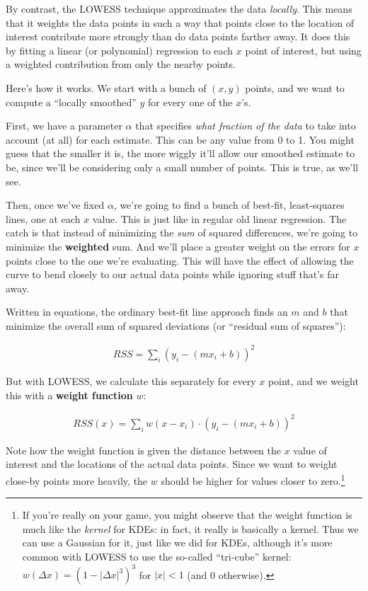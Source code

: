 By contrast, the LOWESS technique approximates the data \textit{locally}. This
means that it weights the data points in such a way that points close to the
location of interest contribute more strongly than do data points farther
away. It does this by fitting a linear (or polynomial) regression to each $x$
point of interest, but using a weighted contribution from only the nearby
points.

Here's how it works. We start with a bunch of $(x,y)$ points, and we want to
compute a ``locally smoothed'' $y$ for every one of the $x$'s. 

First, we have a parameter $\alpha$ that specifies \textit{what fraction of
the data} to take into account (at all) for each estimate. This can be any
value from 0 to 1. You might guess that the smaller it is, the more wiggly
it'll allow our smoothed estimate to be, since we'll be considering only a
small number of points. This is true, as we'll see.

Then, once we've fixed $\alpha$, we're going to find a bunch of best-fit,
least-squares lines, one at each $x$ value. This is just like in regular old
linear regression. The catch is that instead of minimizing the \textit{sum} of
squared differences, we're going to minimize the \textbf{weighted} sum. And
we'll place a greater weight on the errors for $x$ points close to the one
we're evaluating. This will have the effect of allowing the curve to bend
closely to our actual data points while ignoring stuff that's far away.

Written in equations, the ordinary best-fit line approach finds an $m$ and $b$
that minimize the overall sum of squared deviations (or ``residual sum of
squares''):

\begin{align*}
RSS = \sum_i (y_i - (mx_i + b))^2
\end{align*}

But with LOWESS, we calculate this separately for every $x$ point, and we
weight this with a \textbf{weight function} $w$:

\begin{align*}
RSS(x) = \sum_i w(x-x_i) \cdot (y_i - (mx_i + b))^2
\end{align*}

Note how the weight function is given the distance between the $x$ value of
interest and the locations of the actual data points. Since we want to weight
close-by points more heavily, the $w$ should be higher for values closer to
zero.\footnote{ If you're really on your game, you might observe
that the weight function is much like the \textit{kernel} for KDEs: in fact, it
really is basically a kernel.  Thus we can use a
Gaussian for it, just like we did for KDEs, although it's more common with
LOWESS to use the so-called ``tri-cube'' kernel: $w(\Delta x) = (1 - |\Delta
x|^3)^3$ for $|x|<1$ (and 0 otherwise).}

